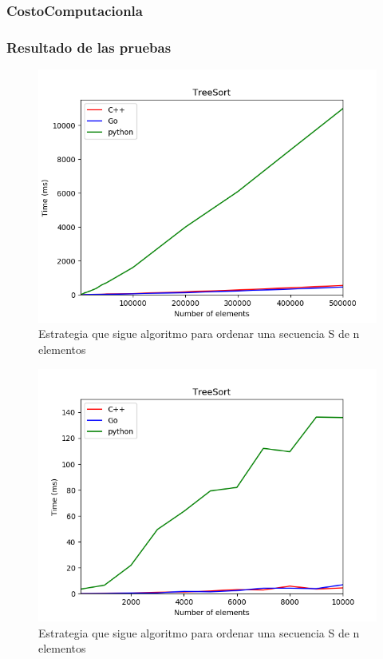 \documentclass{article}
\begin{document}
        \subsubsection{CostoComputacionla}
        \subsubsection{Resultado de las pruebas}
        \begin{figure}[h!]
            \centering
            \includegraphics[width=12cm]{img/treeSort_1.png}
            \caption{Estrategia que sigue algoritmo para ordenar una secuencia S de n elementos}
            \label{fig:mergesort}
        \end {figure}
        \begin{figure}[h!]
            \centering
            \includegraphics[width=12cm]{img/treeSort_2.png}
            \caption{Estrategia que sigue algoritmo para ordenar una secuencia S de n elementos}
            \label{fig:mergesort}
        \end {figure}

	
		
	
\end{document}

